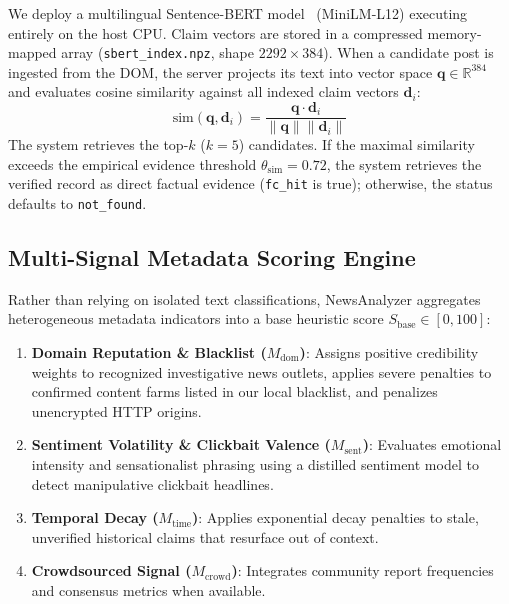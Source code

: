 \documentclass[twoside]{llncs}
\begin{document}
We deploy a multilingual Sentence-BERT model~\cite{reimers2019sbert} (MiniLM-L12) executing entirely on the host CPU. Claim vectors are stored in a compressed memory-mapped array (\texttt{sbert\_index.npz}, shape $2292 \times 384$). When a candidate post is ingested from the DOM, the server projects its text into vector space $\mathbf{q} \in \mathbb{R}^{384}$ and evaluates cosine similarity against all indexed claim vectors $\mathbf{d}_i$:
\begin{equation}
\text{sim}(\mathbf{q}, \mathbf{d}_i) = \frac{\mathbf{q} \cdot \mathbf{d}_i}{\|\mathbf{q}\| \|\mathbf{d}_i\|}
\end{equation}
The system retrieves the top-$k$ ($k=5$) candidates. If the maximal similarity exceeds the empirical evidence threshold $\theta_{\text{sim}} = 0.72$, the system retrieves the verified record as direct factual evidence (\texttt{fc\_hit} is true); otherwise, the status defaults to \texttt{not\_found}.

\subsection{Multi-Signal Metadata Scoring Engine}
Rather than relying on isolated text classifications, NewsAnalyzer aggregates heterogeneous metadata indicators into a base heuristic score $S_{\text{base}} \in [0, 100]$:
\begin{enumerate}
  \item \textbf{Domain Reputation \& Blacklist ($M_{\text{dom}}$)}: Assigns positive credibility weights to recognized investigative news outlets, applies severe penalties to confirmed content farms listed in our local blacklist, and penalizes unencrypted HTTP origins.
  \item \textbf{Sentiment Volatility \& Clickbait Valence ($M_{\text{sent}}$)}: Evaluates emotional intensity and sensationalist phrasing using a distilled sentiment model to detect manipulative clickbait headlines.
  \item \textbf{Temporal Decay ($M_{\text{time}}$)}: Applies exponential decay penalties to stale, unverified historical claims that resurface out of context.
  \item \textbf{Crowdsourced Signal ($M_{\text{crowd}}$)}: Integrates community report frequencies and consensus metrics when available.
\end{enumerate}
\end{document}
